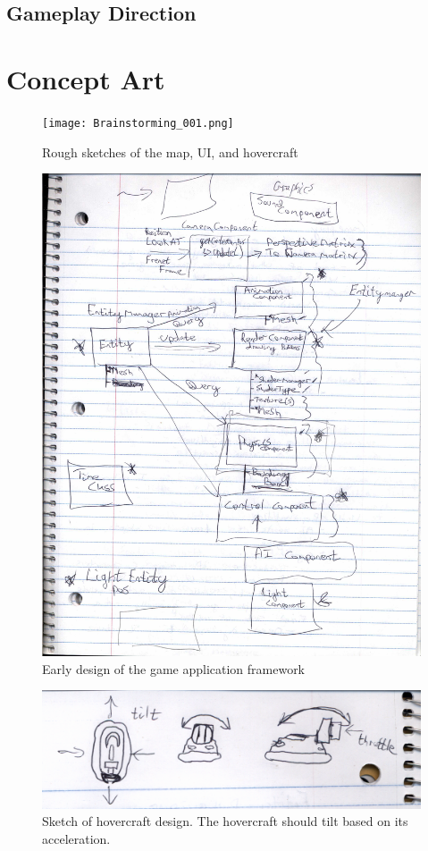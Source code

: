 \documentclass{article}
\theoremstyle{definition}
\begin{document}
\subsection{Gameplay Direction} %


\section{Concept Art}

\begin{figure}[htpb]
  \centering
  \texttt{[image: Brainstorming\_001.png]}
  \caption{Rough sketches of the map, UI, and hovercraft}
\label{fig:Brainstorming_001}
\end{figure}

\begin{figure}[htpb]
  \centering
  \includegraphics[width=0.8\linewidth]{Brainstorming_002.jpg}
  \caption{Early design of the game application framework}
\label{fig:Brainstorming_002}
\end{figure}

\begin{figure}[htpb]
  \centering
  \includegraphics[width=0.8\linewidth]{Brainstorming_003.png}
  \caption{Sketch of hovercraft design. The hovercraft should tilt based on its
  acceleration.}
\label{fig:Brainstorming_003}
\end{figure}
\end{document}
